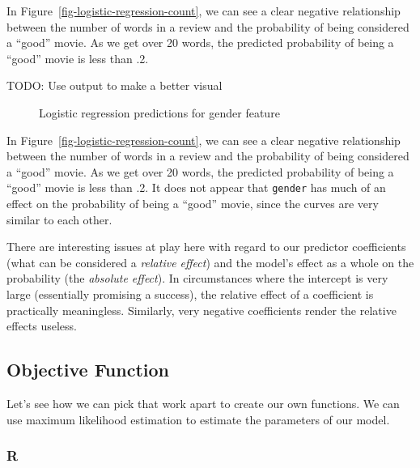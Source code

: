 \documentclass[
  letterpaper,
]{krantz}
\begin{document}
In Figure~\ref{fig-logistic-regression-count}, we can see a clear
negative relationship between the number of words in a review and the
probability of being considered a ``good'' movie. As we get over 20
words, the predicted probability of being a ``good'' movie is less than
.2.

TODO: Use output to make a better visual

\begin{figure}[H]


\caption{\label{fig-logistic-regression-gender}Logistic regression
predictions for gender feature}

\end{figure}%

In Figure~\ref{fig-logistic-regression-count}, we can see a clear
negative relationship between the number of words in a review and the
probability of being considered a ``good'' movie. As we get over 20
words, the predicted probability of being a ``good'' movie is less than
.2. It does not appear that \texttt{gender} has much of an effect on the
probability of being a ``good'' movie, since the curves are very similar
to each other.

There are interesting issues at play here with regard to our predictor
coefficients (what can be considered a \emph{relative effect}) and the
model's effect as a whole on the probability (the \emph{absolute
effect}). In circumstances where the intercept is very large
(essentially promising a success), the relative effect of a coefficient
is practically meaningless. Similarly, very negative coefficients render
the relative effects useless.

\subsection{Objective Function}\label{sec-glm-binomial-objective}

Let's see how we can pick that work apart to create our own functions.
We can use maximum likelihood estimation to estimate the parameters of
our model.

\subsubsection{R}
\end{document}
